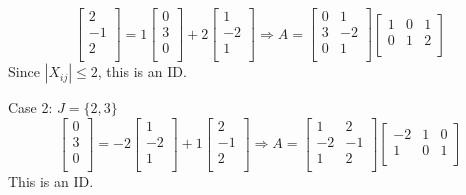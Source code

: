 \begin{equation*}
    \begin{bmatrix}
        2\\
        -1\\
        2\\
    \end{bmatrix}
    =
    1
    \begin{bmatrix}
        0\\
        3\\
        0\\
    \end{bmatrix}
    +2
    \begin{bmatrix}
        1\\
        -2\\
        1\\
    \end{bmatrix}
    \Rightarrow
    A =
    \begin{bmatrix}
        0&1\\
        3&-2\\
        0&1\\
    \end{bmatrix}
    \begin{bmatrix}
        1&0&1\\
        0&1&2\\
    \end{bmatrix}
\end{equation*}
Since $|X_{ij}|\leq 2$, this is an ID.

Case 2: $J=\{2,3\}$
\begin{equation*}
    \begin{bmatrix}
        0\\
        3\\
        0\\
    \end{bmatrix}
    =
    -2
    \begin{bmatrix}
        1\\
        -2\\
        1\\
    \end{bmatrix}
    +1
    \begin{bmatrix}
        2\\
        -1\\
        2\\
    \end{bmatrix}
    \Rightarrow
    A =
    \begin{bmatrix}
        1&2\\
        -2&-1\\
        1&2\\
    \end{bmatrix}
    \begin{bmatrix}
        -2&1&0\\
        1&0&1\\
    \end{bmatrix}
\end{equation*}
This is an ID.

